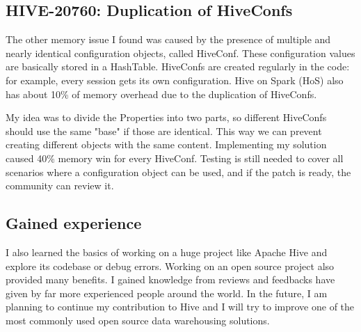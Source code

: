 \subsection{HIVE-20760: Duplication of HiveConfs}
The other memory issue I found was caused by the presence of multiple and nearly identical configuration objects, called HiveConf. These configuration values are basically stored in a HashTable. HiveConfs are created regularly in the code: for example, every session gets its own configuration. Hive on Spark (HoS) also has about 10\% of memory overhead due to the duplication of HiveConfs. 

My idea was to divide the Properties into two parts, so different HiveConfs should use the same "base" if those are identical. This way we can prevent creating different objects with the same content. Implementing my solution caused 40\% memory win for every HiveConf. Testing is still needed to cover all scenarios where a configuration object can be used, and if the patch is ready, the community can review it.

\subsection{Gained experience}
I also learned the basics of working on a huge project like Apache Hive and explore its codebase or debug errors. Working on an open source project also provided many benefits. I gained knowledge from reviews and feedbacks have given by far more experienced people around the world. In the future, I am planning to continue my contribution to Hive and I will try to improve one of the most commonly used open source data warehousing solutions.